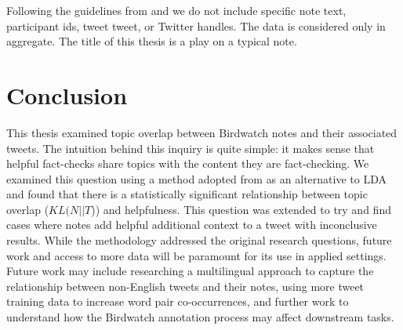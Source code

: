 \documentclass [11pt, proquest] {uwthesis}[2020/02/24]
\begin{document}
Following the guidelines from \cite{williams2017towards} and \cite{fiesler2018participant} we do not include specific note text, participant ids, tweet tweet, or Twitter handles. The data is considered only in aggregate. The title of this thesis is a play on a typical note.


\chapter{Conclusion}

This thesis examined topic overlap between Birdwatch notes and their associated tweets. The intuition behind this inquiry is quite simple: it makes sense that helpful fact-checks share topics with the content they are fact-checking. We examined this question using a method adopted from \cite{sia-etal-2020-tired} as an alternative to LDA and found that there is a statistically significant relationship between topic overlap ($KL(N || T$)) and helpfulness. This question was extended to try and find cases where notes add helpful additional context to a tweet with inconclusive results.
While the methodology addressed the original research questions, future work and access to more data will be paramount for its use in applied settings.
Future work may include researching a multilingual approach to capture the relationship between non-English tweets and their notes, using more tweet training data to increase word pair co-occurrences, and further work to understand how the Birdwatch annotation process may affect downstream tasks.






\end{document}
